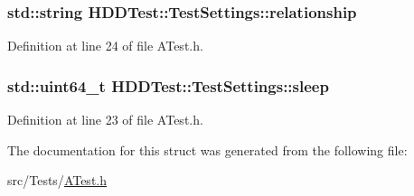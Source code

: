\hypertarget{struct_h_d_d_test_1_1_test_settings_a2ae4bf77f3d9d63cc28ac44622327d23}{
\subsubsection[{relationship}]{\setlength{\rightskip}{0pt plus 5cm}std\-::string H\-D\-D\-Test\-::\-Test\-Settings\-::relationship}}\label{struct_h_d_d_test_1_1_test_settings_a2ae4bf77f3d9d63cc28ac44622327d23}


Definition at line 24 of file A\-Test.\-h.

\hypertarget{struct_h_d_d_test_1_1_test_settings_a689e6ed46e39f14544a7f257c506d9b9}{
\subsubsection[{sleep}]{\setlength{\rightskip}{0pt plus 5cm}std\-::uint64\-\_\-t H\-D\-D\-Test\-::\-Test\-Settings\-::sleep}}\label{struct_h_d_d_test_1_1_test_settings_a689e6ed46e39f14544a7f257c506d9b9}


Definition at line 23 of file A\-Test.\-h.



The documentation for this struct was generated from the following file\-:\begin{DoxyCompactItemize}
\item 
src/\-Tests/\hyperlink{_a_test_8h}{A\-Test.\-h}\end{DoxyCompactItemize}
